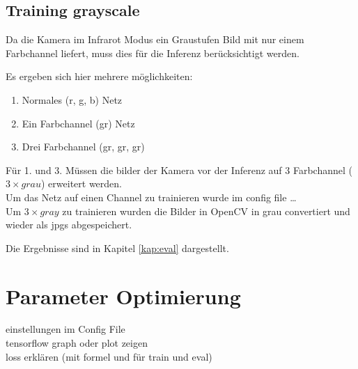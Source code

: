 \subsection{Training grayscale}\label{subsec:train_gray}

Da die Kamera im Infrarot Modus ein Graustufen Bild mit nur einem 
Farbchannel liefert, muss dies für die Inferenz berücksichtigt werden.

Es ergeben sich hier mehrere möglichkeiten:

\begin{enumerate}
    \item Normales (r, g, b) Netz
    \item Ein Farbchannel (gr) Netz
    \item Drei Farbchannel (gr, gr, gr)
\end{enumerate}

Für 1. und 3. Müssen die bilder der Kamera vor der 
Inferenz auf 3 Farbchannel ($3 \times grau$) erweitert werden.
\\
Um das Netz auf einen Channel zu trainieren wurde im config file \dots
\\
Um $3 \times gray$ zu trainieren wurden die Bilder in OpenCV in 
grau convertiert und wieder als jpgs abgespeichert.

Die Ergebnisse sind in Kapitel \ref{kap:eval} dargestellt.


\section{Parameter Optimierung}
einstellungen im Config File\\
tensorflow graph oder plot zeigen\\
loss erklären (mit formel und für train und eval)


